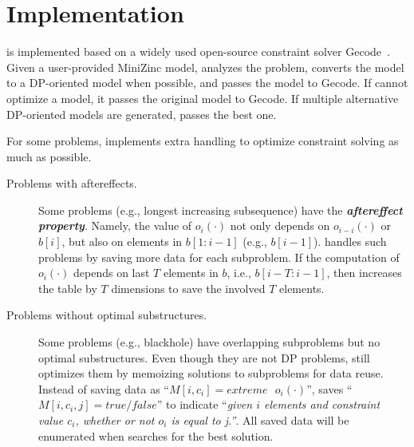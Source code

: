 \section{Implementation}
\label{sec:impl}

\tool is implemented based on a widely used  open-source constraint solver Gecode~\cite{schulte2006gecode}. 
Given a user-provided MiniZinc model, \tool analyzes the problem, converts the model to a DP-oriented model when possible, and passes the model to Gecode. 
If \tool cannot optimize a model, it passes the original model to Gecode. 
If multiple alternative DP-oriented models are generated, \tool passes the best one. 

For some problems, \tool implements extra handling to optimize constraint solving as much as possible. 

	\begin{description}
		\item[Problems with aftereffects.] 
		Some problems (e.g., longest increasing subsequence) have the \textbf{\emph{aftereffect property}}. Namely, the value of $o_i(\cdot)$ not only depends on $o_{i-i}(\cdot)$ or $b[i]$, but also on elements in $b[1:i-1]$ (e.g., $b[i-1]$). \tool handles such problems by saving more data for each subproblem. If the computation of $o_i(\cdot)$ depends on last $T$ elements in $b$, i.e., $b[i-T:i-1]$, then \tool increases the table by $T$ dimensions to save the involved $T$ elements.  
		
		
		\item[Problems without optimal substructures.] Some problems (e.g., blackhole) have overlapping subproblems but no optimal substructures. Even though they are not DP problems, \tool still optimizes them by memoizing solutions to subproblems for data reuse. Instead of saving data as ``$M[i, c_i]=extreme\text{ }o_i(\cdot)$'', \tool saves ``$M[i, c_i, j]=true/false$'' to indicate ``\emph{given $i$ elements and constraint value $c_i$, whether or not $o_i$ is equal to j.''}. 
		All saved data will be enumerated when \tool searches for the best solution. 
		

\end{description}

